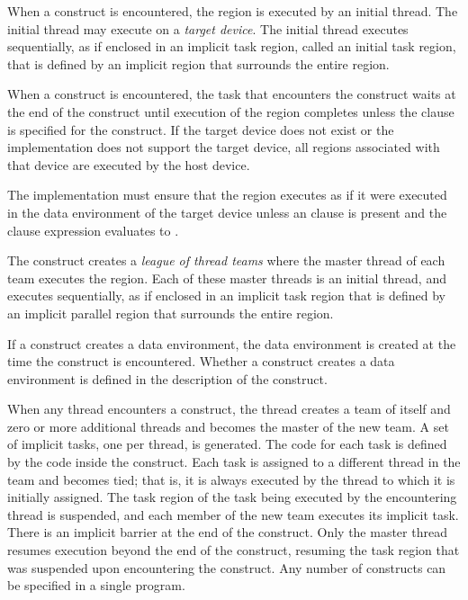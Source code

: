 When a  construct is encountered, the  region is executed by an initial thread.  The initial thread may execute on a \emph{target device}.  The initial thread executes sequentially, as if enclosed in an implicit task region, called an initial task region, that is defined by an implicit  region that surrounds the entire  region.

When a  construct is encountered, the task that encounters the  construct waits at the end of the construct until execution of the region completes unless the  clause is specified for the construct.  If the target device does not exist or the implementation does not support the target device, all  regions associated with that device are executed by the host device.

The implementation must ensure that the  region executes as if it were executed in the data environment of the target device unless an  clause is present and the  clause expression evaluates to .

The  construct creates a \emph{league of thread teams} 
where the master thread of each
team executes the region. Each of these master threads is an initial thread, and executes
sequentially, as if enclosed in an implicit task region that is defined by an implicit
parallel region that surrounds the entire  region.

If a construct creates a data environment, the data environment is created at the time the
construct is encountered. Whether a construct creates a data environment is defined in 
the description of the construct.

When any thread encounters a  construct, the thread creates a team of itself
and zero or more additional threads and becomes the master of the new team. A set of 
implicit tasks, one per thread, is generated. The code for each task is defined by the code 
inside the  construct. Each task is assigned to a different thread in the team
and becomes tied; that is, it is always executed by the thread to which it is initially 
assigned. The task region of the task being executed by the encountering thread is 
suspended, and each member of the new team executes its implicit task. There is an 
implicit barrier at the end of the  construct. Only the master thread resumes
execution beyond the end of the  construct, resuming the task region that
was suspended upon encountering the  construct. Any number of
 constructs can be specified in a single program.

